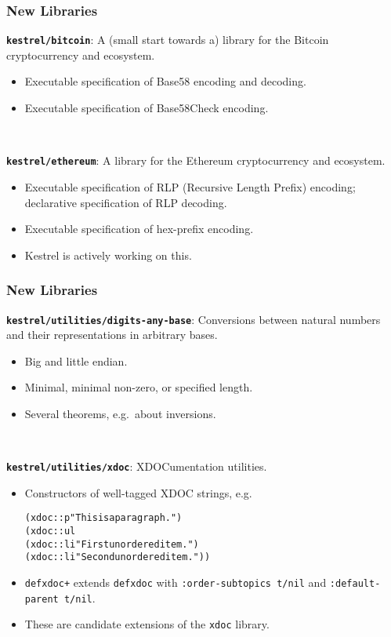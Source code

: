 \documentclass{beamer}
\newcommand{\code}[1]{\texttt{#1}}
\newenvironment{codeblock}{\begin{alltt}}{\end{alltt}}
\newcommand{\bookpath}[1]{\textbf{\code{#1}}}
\newcommand{\newlibtitle}{\frametitle{New Libraries}}
\begin{document}

\begin{frame}

\newlibtitle

\bookpath{kestrel/bitcoin}:
A (small start towards a) library for the Bitcoin cryptocurrency and ecosystem.
\begin{itemize}
\item
Executable specification of Base58 encoding and decoding.
\item
Executable specification of Base58Check encoding.
\end{itemize}

\

\bookpath{kestrel/ethereum}:
A library for the Ethereum
cryptocurrency and ecosystem.
\begin{itemize}
\item
Executable specification of RLP (Recursive Length Prefix) encoding;
declarative specification of RLP decoding.
\item
Executable specification of hex-prefix encoding.
\item
Kestrel is actively working on this.
\end{itemize}

\end{frame}


\begin{frame}[fragile]

\newlibtitle

\bookpath{kestrel/utilities/digits-any-base}:
Conversions between natural numbers
and their representations in arbitrary bases.
\begin{itemize}
\item
Big and little endian.
\item
Minimal, minimal non-zero, or specified length.
\item
Several theorems, e.g.\ about inversions.
\end{itemize}

\

\bookpath{kestrel/utilities/xdoc}:
XDOCumentation utilities.
\begin{itemize}
\item
Constructors of well-tagged XDOC strings, e.g.
\begin{codeblock}
(xdoc::p "This is a paragraph.")
(xdoc::ul
  (xdoc::li "First unordered item.")
  (xdoc::li "Second unordered item."))
\end{codeblock}
\item
\code{defxdoc+} extends \code{defxdoc} with
\code{:order-subtopics t/nil} and \code{:default-parent t/nil}.
\item
These are candidate extensions of the \code{xdoc} library.
\end{itemize}

\end{frame}
\end{document}
